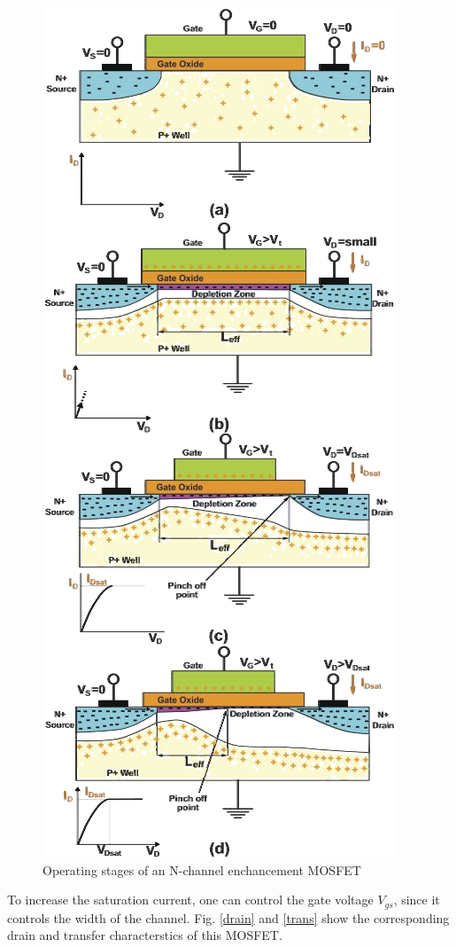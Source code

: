\begin{figure}[H]
    \centering
    \includegraphics[width=0.65\columnwidth]{images/stages1.png}
    \caption{Operating stages of an N-channel enchancement MOSFET}
\end{figure}

To increase the saturation current, one can control the gate voltage $V_{gs}$, since it controls the width of the channel. Fig. \ref{drain} and \ref{trans} show the corresponding drain and transfer characterstics of this MOSFET.

